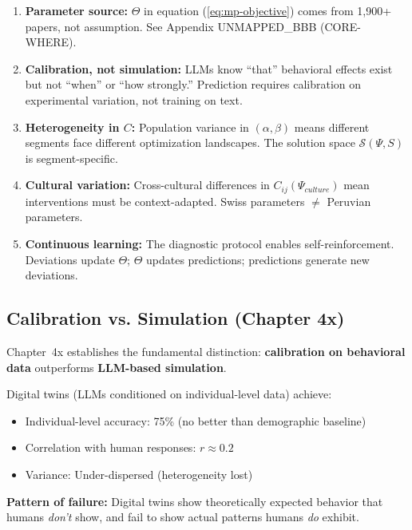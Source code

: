 \begin{enumerate}
\item \textbf{Parameter source:} $\Theta$ in equation (\ref{eq:mp-objective}) comes from
      1,900+ papers, not assumption. See Appendix UNMAPPED_BBB (CORE-WHERE).

\item \textbf{Calibration, not simulation:} LLMs know ``that'' behavioral effects exist
      but not ``when'' or ``how strongly.'' Prediction requires calibration on experimental
      variation, not training on text.

\item \textbf{Heterogeneity in $C$:} Population variance in $(\alpha, \beta)$ means
      different segments face different optimization landscapes. The solution space
      $\mathcal{S}(\Psi, S)$ is segment-specific.

\item \textbf{Cultural variation:} Cross-cultural differences in $C_{ij}(\Psi_{culture})$
      mean interventions must be context-adapted. Swiss parameters $\neq$ Peruvian parameters.

\item \textbf{Continuous learning:} The diagnostic protocol enables self-reinforcement.
      Deviations update $\Theta$; $\Theta$ updates predictions; predictions generate new deviations.
\end{enumerate}

\subsection{Calibration vs. Simulation (Chapter 4x)}

Chapter~4x establishes the fundamental distinction: \textbf{calibration on behavioral data}
outperforms \textbf{LLM-based simulation}.

\begin{tcolorbox}[colback=red!5!white, colframe=red!75!black,
    title=\textbf{The Peng et al. Finding (2025)}]

Digital twins (LLMs conditioned on individual-level data) achieve:
\begin{itemize}
\item Individual-level accuracy: 75\% (no better than demographic baseline)
\item Correlation with human responses: $r \approx 0.2$
\item Variance: Under-dispersed (heterogeneity lost)
\end{itemize}

\textbf{Pattern of failure:} Digital twins show theoretically expected behavior that
humans \textit{don't} show, and fail to show actual patterns humans \textit{do} exhibit.

\end{tcolorbox}

